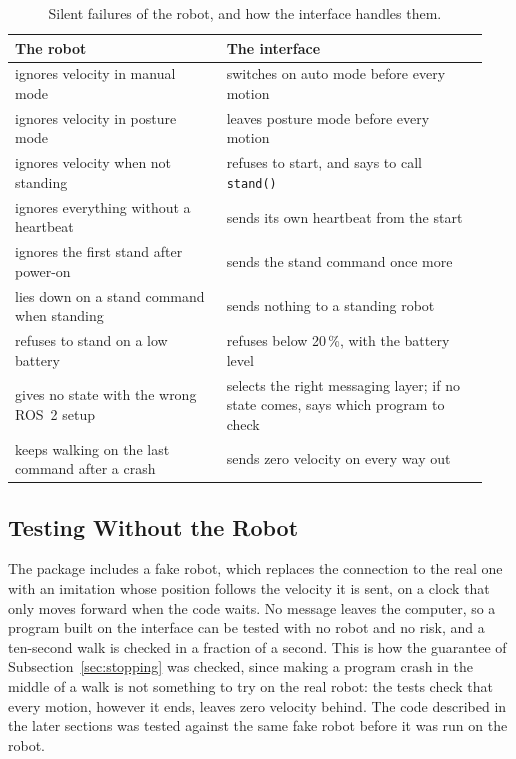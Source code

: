 \begin{table}[htbp]
\centering
\caption{Silent failures of the robot, and how the interface handles them.}
\label{tab:errors}
\begin{tabular}{@{}p{0.42\linewidth}p{0.52\linewidth}@{}}
\toprule
The robot & The interface \\
\midrule
ignores velocity in manual mode & switches on auto mode before every motion \\
ignores velocity in posture mode & leaves posture mode before every motion \\
ignores velocity when not standing & refuses to start, and says to call \texttt{stand()} \\
ignores everything without a heartbeat & sends its own heartbeat from the start \\
ignores the first stand after power-on & sends the stand command once more \\
lies down on a stand command when standing & sends nothing to a standing robot \\
refuses to stand on a low battery & refuses below 20\,\%, with the battery level \\
gives no state with the wrong ROS~2 setup & selects the right messaging layer; if no state comes, says which program to check \\
keeps walking on the last command after a crash & sends zero velocity on every way out \\
\bottomrule
\end{tabular}
\end{table}

\subsection{Testing Without the Robot}
\label{sec:testing}

The package includes a fake robot, which replaces the connection to the real one with an imitation whose
position follows the velocity it is sent, on a clock that only moves forward when the code waits. No message
leaves the computer, so a program built on the interface can be tested with no robot and no risk, and a
ten-second walk is checked in a fraction of a second. This is how the guarantee of Subsection~\ref{sec:stopping}
was checked, since making a program crash in the middle of a walk is not something to try on the real robot:
the tests check that every motion, however it ends, leaves zero velocity behind. The code described in the
later sections was tested against the same fake robot before it was run on the robot.

